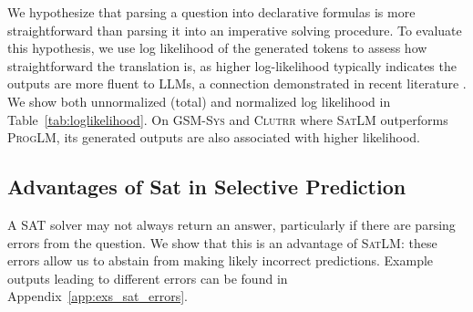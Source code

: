 \documentclass{article}
\theoremstyle{definition}
\newcommand{\gsmsys}{\textsc{GSM-Sys}}
\newcommand{\clutrr}{\textsc{Clutrr}}
\newcommand{\satlm}{\textsc{SatLM}}
\newcommand{\pallm}{\textsc{ProgLM}}
\begin{document}
We hypothesize that parsing a question into declarative formulas is more straightforward than parsing it into an imperative solving procedure. To evaluate this hypothesis, we use log likelihood of the generated tokens to assess how straightforward the translation is, as higher log-likelihood typically indicates the outputs are more fluent to LLMs, a connection demonstrated in recent literature \citep{hila2022,optexpl}. We show both unnormalized (total) and normalized log likelihood in Table~\ref{tab:loglikelihood}. On \gsmsys{} and \clutrr{} where \satlm{} outperforms \pallm{}, its generated outputs are also associated with higher likelihood. %

\subsection{Advantages of {\sc Sat} in Selective Prediction}\label{sec:selective_pred}

A SAT solver may not always return an answer, particularly if there are parsing errors from the question. We show that this is an advantage of \satlm{}: these errors allow us to abstain from making likely incorrect predictions. %
Example outputs leading to different errors can be found in Appendix~\ref{app:exs_sat_errors}.
\end{document}
